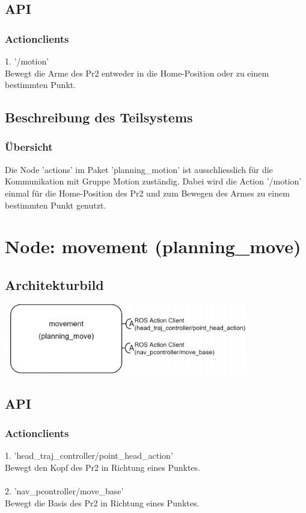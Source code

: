 \documentclass{suturo}
\begin{document}
\subsection{API}
\subsubsection{Actionclients}
1. '/motion' \\
Bewegt die Arme des Pr2 entweder in die Home-Position oder zu einem bestimmten Punkt.
\subsection{Beschreibung des Teilsystems}
\subsubsection{\"Ubersicht}
Die Node 'actions' im Paket 'planning\_motion'  ist ausschliesslich für die Kommunikation mit Gruppe Motion zuständig. Dabei wird die Action '/motion' einmal für die Home-Position des Pr2 und zum Bewegen des Armes zu einem bestimmten Punkt genutzt.

\section{Node: movement (planning\_move)}
\subsection{Architekturbild}
\begin{center} \includegraphics[width=0.8\textwidth]{img/diag_planning_move.png} \end{center}
\subsection{API}
\subsubsection{Actionclients}
1. 'head\_traj\_controller/point\_head\_action' \\
Bewegt den Kopf des Pr2 in Richtung eines Punktes.\\ \\
2. 'nav\_pcontroller/move\_base' \\
Bewegt die Basis des Pr2 in Richtung eines Punktes.
\end{document}
